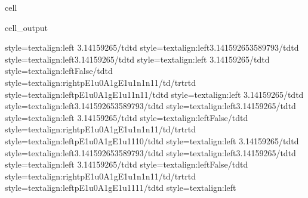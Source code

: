 \documentclass[letterpaper,table,10pt,english]{jupyterBook}
\begin{document}
\begin{sphinxuseclass}{cell}
\begin{sphinxVerbatimOutput}
\begin{sphinxuseclass}{cell_output}
\begin{sphinxVerbatim}[commandchars=\\\{\}]
style=\PYGZbs{}\PYGZsq{}text\PYGZhy{}align:left\PYGZbs{}\PYGZsq{}\PYGZgt{} 3.14159265\PYGZlt{}/td\PYGZgt{}\PYGZlt{}td style=\PYGZbs{}\PYGZsq{}text\PYGZhy{}align:left\PYGZbs{}\PYGZsq{}\PYGZgt{}3.141592653589793\PYGZlt{}/td\PYGZgt{}\PYGZlt{}td style=\PYGZbs{}\PYGZsq{}text\PYGZhy{}align:left\PYGZbs{}\PYGZsq{}\PYGZgt{}\PYGZhy{}3.14159265\PYGZlt{}/td\PYGZgt{}\PYGZlt{}td style=\PYGZbs{}\PYGZsq{}text\PYGZhy{}align:left\PYGZbs{}\PYGZsq{}\PYGZgt{} 3.14159265\PYGZlt{}/td\PYGZgt{}\PYGZlt{}td style=\PYGZbs{}\PYGZsq{}text\PYGZhy{}align:left\PYGZbs{}\PYGZsq{}\PYGZgt{}False\PYGZlt{}/td\PYGZgt{}\PYGZlt{}td style=\PYGZbs{}\PYGZsq{}text\PYGZhy{}align:right\PYGZbs{}\PYGZsq{}\PYGZgt{}p\PYGZus{}E1u\PYGZus{}0\PYGZus{}A1g\PYGZus{}E1u\PYGZus{}1\PYGZus{}n1\PYGZus{}n1\PYGZus{}1\PYGZlt{}/td\PYGZgt{}\PYGZlt{}/tr\PYGZgt{}\PYGZlt{}tr\PYGZgt{}\PYGZlt{}td style=\PYGZbs{}\PYGZsq{}text\PYGZhy{}align:left\PYGZbs{}\PYGZsq{}\PYGZgt{}p\PYGZus{}E1u\PYGZus{}0\PYGZus{}A1g\PYGZus{}E1u\PYGZus{}1\PYGZus{}1\PYGZus{}n1\PYGZus{}1\PYGZlt{}/td\PYGZgt{}\PYGZlt{}td style=\PYGZbs{}\PYGZsq{}text\PYGZhy{}align:left\PYGZbs{}\PYGZsq{}\PYGZgt{} 3.14159265\PYGZlt{}/td\PYGZgt{}\PYGZlt{}td style=\PYGZbs{}\PYGZsq{}text\PYGZhy{}align:left\PYGZbs{}\PYGZsq{}\PYGZgt{}3.141592653589793\PYGZlt{}/td\PYGZgt{}\PYGZlt{}td style=\PYGZbs{}\PYGZsq{}text\PYGZhy{}align:left\PYGZbs{}\PYGZsq{}\PYGZgt{}\PYGZhy{}3.14159265\PYGZlt{}/td\PYGZgt{}\PYGZlt{}td style=\PYGZbs{}\PYGZsq{}text\PYGZhy{}align:left\PYGZbs{}\PYGZsq{}\PYGZgt{} 3.14159265\PYGZlt{}/td\PYGZgt{}\PYGZlt{}td style=\PYGZbs{}\PYGZsq{}text\PYGZhy{}align:left\PYGZbs{}\PYGZsq{}\PYGZgt{}False\PYGZlt{}/td\PYGZgt{}\PYGZlt{}td style=\PYGZbs{}\PYGZsq{}text\PYGZhy{}align:right\PYGZbs{}\PYGZsq{}\PYGZgt{}p\PYGZus{}E1u\PYGZus{}0\PYGZus{}A1g\PYGZus{}E1u\PYGZus{}1\PYGZus{}n1\PYGZus{}n1\PYGZus{}1\PYGZlt{}/td\PYGZgt{}\PYGZlt{}/tr\PYGZgt{}\PYGZlt{}tr\PYGZgt{}\PYGZlt{}td style=\PYGZbs{}\PYGZsq{}text\PYGZhy{}align:left\PYGZbs{}\PYGZsq{}\PYGZgt{}p\PYGZus{}E1u\PYGZus{}0\PYGZus{}A1g\PYGZus{}E1u\PYGZus{}1\PYGZus{}1\PYGZus{}1\PYGZus{}0\PYGZlt{}/td\PYGZgt{}\PYGZlt{}td style=\PYGZbs{}\PYGZsq{}text\PYGZhy{}align:left\PYGZbs{}\PYGZsq{}\PYGZgt{} 3.14159265\PYGZlt{}/td\PYGZgt{}\PYGZlt{}td style=\PYGZbs{}\PYGZsq{}text\PYGZhy{}align:left\PYGZbs{}\PYGZsq{}\PYGZgt{}3.141592653589793\PYGZlt{}/td\PYGZgt{}\PYGZlt{}td style=\PYGZbs{}\PYGZsq{}text\PYGZhy{}align:left\PYGZbs{}\PYGZsq{}\PYGZgt{}\PYGZhy{}3.14159265\PYGZlt{}/td\PYGZgt{}\PYGZlt{}td style=\PYGZbs{}\PYGZsq{}text\PYGZhy{}align:left\PYGZbs{}\PYGZsq{}\PYGZgt{} 3.14159265\PYGZlt{}/td\PYGZgt{}\PYGZlt{}td style=\PYGZbs{}\PYGZsq{}text\PYGZhy{}align:left\PYGZbs{}\PYGZsq{}\PYGZgt{}False\PYGZlt{}/td\PYGZgt{}\PYGZlt{}td style=\PYGZbs{}\PYGZsq{}text\PYGZhy{}align:right\PYGZbs{}\PYGZsq{}\PYGZgt{}p\PYGZus{}E1u\PYGZus{}0\PYGZus{}A1g\PYGZus{}E1u\PYGZus{}1\PYGZus{}n1\PYGZus{}n1\PYGZus{}1\PYGZlt{}/td\PYGZgt{}\PYGZlt{}/tr\PYGZgt{}\PYGZlt{}tr\PYGZgt{}\PYGZlt{}td style=\PYGZbs{}\PYGZsq{}text\PYGZhy{}align:left\PYGZbs{}\PYGZsq{}\PYGZgt{}p\PYGZus{}E1u\PYGZus{}0\PYGZus{}A1g\PYGZus{}E1u\PYGZus{}1\PYGZus{}1\PYGZus{}1\PYGZus{}1\PYGZlt{}/td\PYGZgt{}\PYGZlt{}td style=\PYGZbs{}\PYGZsq{}text\PYGZhy{}align:left\PYGZbs{}\PYGZsq{}\PYGZgt{} 
\end{sphinxVerbatim}
\end{sphinxuseclass}
\end{sphinxVerbatimOutput}
\end{sphinxuseclass}
\end{document}
